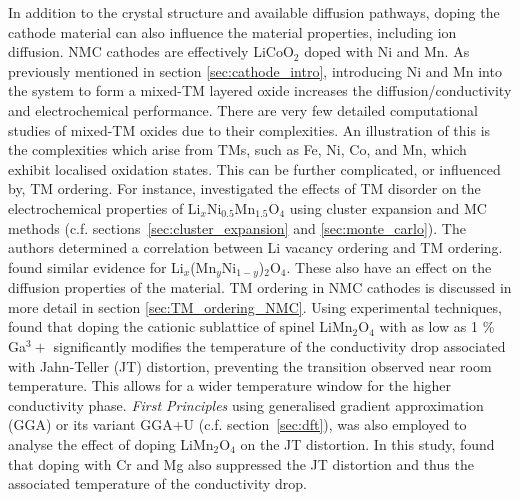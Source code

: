 \documentclass[../main.tex]{subfiles}
\begin{document}
In addition to the crystal structure and available diffusion pathways, doping the cathode material can also influence the material properties, including ion diffusion. NMC cathodes are effectively LiCoO$_2$ doped with Ni and Mn. As previously mentioned in section \ref{sec:cathode_intro}, introducing Ni and Mn into the system to form a mixed-TM layered oxide increases the diffusion/conductivity and electrochemical performance. There are very few detailed computational studies of mixed-TM oxides due to their complexities. An illustration of this is the complexities which arise from TMs, such as Fe, Ni, Co, and Mn, which exhibit localised oxidation states. This can be further complicated, or influenced by, TM ordering. For instance, \citeauthor{lee2013solid} investigated the effects of TM disorder on the electrochemical properties of Li$_x$Ni$_{0.5}$Mn$_{1.5}$O$_4$ using cluster expansion and MC methods (c.f. sections~\ref{sec:cluster_expansion} and \ref{sec:monte_carlo}). The authors determined a correlation between Li vacancy ordering and TM ordering.\cite{lee2013solid} \citeauthor{hao2016quaternary} found similar evidence for Li$_x$(Mn$_y$Ni$_{1-y}$)$_2$O$_4$.\cite{hao2016quaternary} These also have an effect on the diffusion properties of the material. TM ordering in NMC cathodes is discussed in more detail in section \ref{sec:TM_ordering_NMC}. Using experimental techniques, \citeauthor{capsoni2002inhibition} found that doping the cationic sublattice of spinel LiMn$_2$O$_4$ with as low as 1 \% Ga${^3+}$ significantly modifies the temperature of the conductivity drop associated with Jahn-Teller (JT) distortion, preventing the transition observed near room temperature. \cite{capsoni2002inhibition} This allows for a wider temperature window for the higher conductivity phase. \textit{First Principles} using generalised gradient approximation (GGA) or its variant GGA+U (c.f. section~\ref{sec:dft}), was also employed to analyse the effect of doping LiMn$_2$O$_4$ on the JT distortion. In this study, \citeauthor{singh2009suppression} found that doping with Cr and Mg also suppressed the JT distortion and thus the associated temperature of the conductivity drop.\cite{singh2009suppression} 
\end{document}
